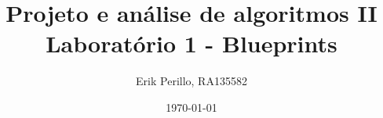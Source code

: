 \documentclass[7pt]{article}
\begin{document}

\author{Erik Perillo, RA135582}
\date{\today}
\title{%
	{\small Projeto e análise de algoritmos II}\\
	{\Large Laboratório 1 - Blueprints}}
\maketitle\vspace{-1.3cm}
\posttitle{\par\end{center}}

\makeatletter
\def\BState{\State\hskip-\ALG@thistlm}
\makeatother

\end{document}
